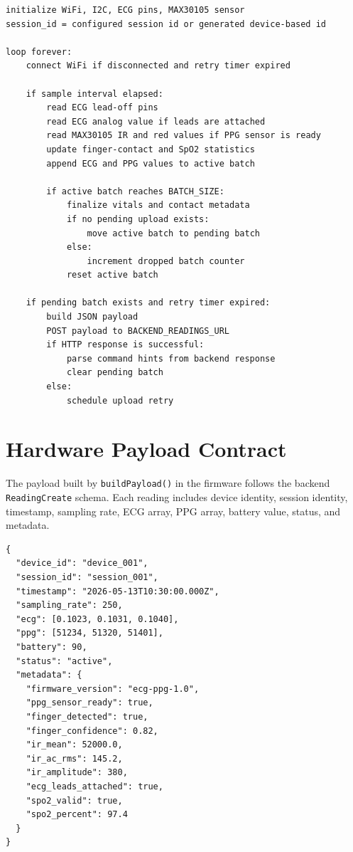 \begin{lstlisting}[caption={Pseudocode for hardware sampling and batch upload}]
initialize WiFi, I2C, ECG pins, MAX30105 sensor
session_id = configured session id or generated device-based id

loop forever:
    connect WiFi if disconnected and retry timer expired

    if sample interval elapsed:
        read ECG lead-off pins
        read ECG analog value if leads are attached
        read MAX30105 IR and red values if PPG sensor is ready
        update finger-contact and SpO2 statistics
        append ECG and PPG values to active batch

        if active batch reaches BATCH_SIZE:
            finalize vitals and contact metadata
            if no pending upload exists:
                move active batch to pending batch
            else:
                increment dropped batch counter
            reset active batch

    if pending batch exists and retry timer expired:
        build JSON payload
        POST payload to BACKEND_READINGS_URL
        if HTTP response is successful:
            parse command hints from backend response
            clear pending batch
        else:
            schedule upload retry
\end{lstlisting}

\section{Hardware Payload Contract}

The payload built by \texttt{buildPayload()} in the firmware follows the backend \texttt{ReadingCreate} schema. Each reading includes device identity, session identity, timestamp, sampling rate, ECG array, PPG array, battery value, status, and metadata.

\begin{lstlisting}[caption={Conceptual reading payload sent by the hardware}]
{
  "device_id": "device_001",
  "session_id": "session_001",
  "timestamp": "2026-05-13T10:30:00.000Z",
  "sampling_rate": 250,
  "ecg": [0.1023, 0.1031, 0.1040],
  "ppg": [51234, 51320, 51401],
  "battery": 90,
  "status": "active",
  "metadata": {
    "firmware_version": "ecg-ppg-1.0",
    "ppg_sensor_ready": true,
    "finger_detected": true,
    "finger_confidence": 0.82,
    "ir_mean": 52000.0,
    "ir_ac_rms": 145.2,
    "ir_amplitude": 380,
    "ecg_leads_attached": true,
    "spo2_valid": true,
    "spo2_percent": 97.4
  }
}
\end{lstlisting}

